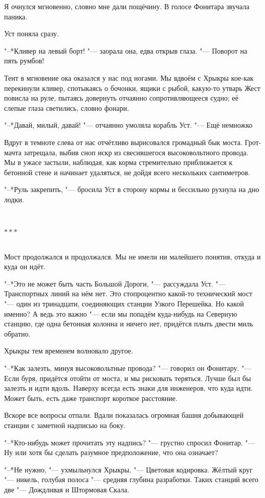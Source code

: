 \documentclass[a4paper,12pt,fleqn]{book}
\newcommand{\ldotst}{\so{...}\xspace}
\newcommand{\razd}{~\\{\centering\Large\bfseries$\ast \ast \ast$\par}~\\}
\begin{document}
Я очнулся мгновенно, словно мне дали пощёчину.
В голосе Фонитара звучала паника.

Уст поняла сразу.

"--*Кливер на левый борт! "--- заорала она, едва открыв глаза.
"--- Поворот на пять румбов!

Тент в мгновение ока оказался у нас под ногами.
Мы вдвоём с Хрыкры кое-как перекинули кливер, спотыкаясь о бочонки, ящики с рыбой, какую-то утварь\ldotst
Жест повисла на руле, пытаясь довернуть отчаянно сопротивляющееся судно;
её слепые глаза светились, словно фонари.

"--*Давай, милый, давай! "--- отчаянно умоляла корабль Уст.
"--- Ещё немножко\ldotst

Вдруг в темноте слева от нас отчётливо вырисовался громадный бык моста.
Грот-мачта затрещала, выбив сноп искр из свесившегося высоковольтного провода.
Мы в ужасе застыли, наблюдая, как корма стремительно приближается к бетонной стене\ldotst и начинает удаляться, не дойдя всего нескольких сантиметров.

"--*Руль закрепить, "--- бросила Уст в сторону кормы и бессильно рухнула на дно лодки.

\razd

Мост продолжался и продолжался.
Мы не имели ни малейшего понятия, откуда и куда он идёт.

"--*Это не может быть часть Большой Дороги, "--- рассуждала Уст.
"--- Транспортных линий на нём нет.
Это стопроцентно какой-то технический мост "--- один из тринадцати, соединяющих станции Узкого Перешейка.
Но какой именно?
А ведь это важно "--- если мы попадём куда-нибудь на Северную станцию, где одна бетонная колонна и ничего нет, придётся плыть двести миль обратно.

Хрыкры тем временем волновало другое.

"--*Как залезть, минуя высоковольтные провода? "--- говорил он Фонитару.
"--- Если буря, придётся отойти от моста, и мы рисковать теряться.
Лучше был бы залезть и идти вдоль.
Наверху всегда есть знаки для инженеров, что куда идти.
Может быть, есть даже транспорт короткое расстояние.

Вскоре все вопросы отпали.
Вдали показалась огромная башня добывающей станции с заметной надписью на боку.

"--*Кто-нибудь может прочитать эту надпись? "--- грустно спросил Фонитар.
"--- Ну или хотя бы сделать разумное предположение, что она означает?

"--*Не нужно, "--- ухмыльнулся Хрыкры.
"--- Цветовая кодировка.
Жёлтый круг "--- никель, голубая полоса "--- средняя глубина разработки.
Таких станций всего две "--- Дождливая и Штормовая Скала.
\end{document}
